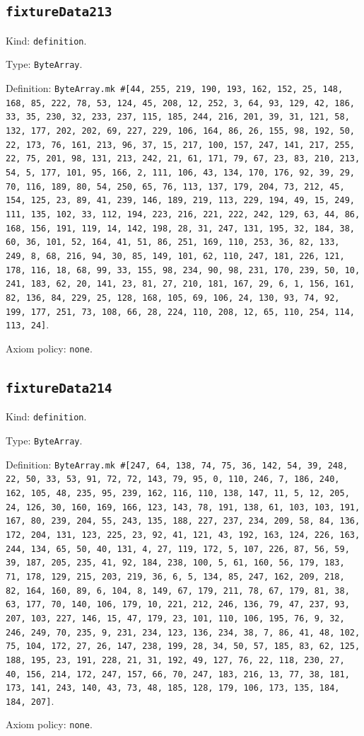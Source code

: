 \documentclass[11pt]{article}
\begin{document}
\subsection*{\texttt{fixtureData213}}
\noindent Kind: \texttt{definition}.\par
\noindent Type: \texttt{ByteArray}.\par
\noindent Definition: \texttt{ByteArray.mk \#[44, 255, 219, 190, 193, 162, 152, 25, 148, 168, 85, 222, 78, 53, 124, 45, 208, 12, 252, 3, 64, 93, 129, 42, 186, 33, 35, 230, 32, 233, 237, 115, 185, 244, 216, 201, 39, 31, 121, 58, 132, 177, 202, 202, 69, 227, 229, 106, 164, 86, 26, 155, 98, 192, 50, 22, 173, 76, 161, 213, 96, 37, 15, 217, 100, 157, 247, 141, 217, 255, 22, 75, 201, 98, 131, 213, 242, 21, 61, 171, 79, 67, 23, 83, 210, 213, 54, 5, 177, 101, 95, 166, 2, 111, 106, 43, 134, 170, 176, 92, 39, 29, 70, 116, 189, 80, 54, 250, 65, 76, 113, 137, 179, 204, 73, 212, 45, 154, 125, 23, 89, 41, 239, 146, 189, 219, 113, 229, 194, 49, 15, 249, 111, 135, 102, 33, 112, 194, 223, 216, 221, 222, 242, 129, 63, 44, 86, 168, 156, 191, 119, 14, 142, 198, 28, 31, 247, 131, 195, 32, 184, 38, 60, 36, 101, 52, 164, 41, 51, 86, 251, 169, 110, 253, 36, 82, 133, 249, 8, 68, 216, 94, 30, 85, 149, 101, 62, 110, 247, 181, 226, 121, 178, 116, 18, 68, 99, 33, 155, 98, 234, 90, 98, 231, 170, 239, 50, 10, 241, 183, 62, 20, 141, 23, 81, 27, 210, 181, 167, 29, 6, 1, 156, 161, 82, 136, 84, 229, 25, 128, 168, 105, 69, 106, 24, 130, 93, 74, 92, 199, 177, 251, 73, 108, 66, 28, 224, 110, 208, 12, 65, 110, 254, 114, 113, 24]}.\par
\noindent Axiom policy: \texttt{none}.\par
\subsection*{\texttt{fixtureData214}}
\noindent Kind: \texttt{definition}.\par
\noindent Type: \texttt{ByteArray}.\par
\noindent Definition: \texttt{ByteArray.mk \#[247, 64, 138, 74, 75, 36, 142, 54, 39, 248, 22, 50, 33, 53, 91, 72, 72, 143, 79, 95, 0, 110, 246, 7, 186, 240, 162, 105, 48, 235, 95, 239, 162, 116, 110, 138, 147, 11, 5, 12, 205, 24, 126, 30, 160, 169, 166, 123, 143, 78, 191, 138, 61, 103, 103, 191, 167, 80, 239, 204, 55, 243, 135, 188, 227, 237, 234, 209, 58, 84, 136, 172, 204, 131, 123, 225, 23, 92, 41, 121, 43, 192, 163, 124, 226, 163, 244, 134, 65, 50, 40, 131, 4, 27, 119, 172, 5, 107, 226, 87, 56, 59, 39, 187, 205, 235, 41, 92, 184, 238, 100, 5, 61, 160, 56, 179, 183, 71, 178, 129, 215, 203, 219, 36, 6, 5, 134, 85, 247, 162, 209, 218, 82, 164, 160, 89, 6, 104, 8, 149, 67, 179, 211, 78, 67, 179, 81, 38, 63, 177, 70, 140, 106, 179, 10, 221, 212, 246, 136, 79, 47, 237, 93, 207, 103, 227, 146, 15, 47, 179, 23, 101, 110, 106, 195, 76, 9, 32, 246, 249, 70, 235, 9, 231, 234, 123, 136, 234, 38, 7, 86, 41, 48, 102, 75, 104, 172, 27, 26, 147, 238, 199, 28, 34, 50, 57, 185, 83, 62, 125, 188, 195, 23, 191, 228, 21, 31, 192, 49, 127, 76, 22, 118, 230, 27, 40, 156, 214, 172, 247, 157, 66, 70, 247, 183, 216, 13, 77, 38, 181, 173, 141, 243, 140, 43, 73, 48, 185, 128, 179, 106, 173, 135, 184, 184, 207]}.\par
\noindent Axiom policy: \texttt{none}.\par
\end{document}

